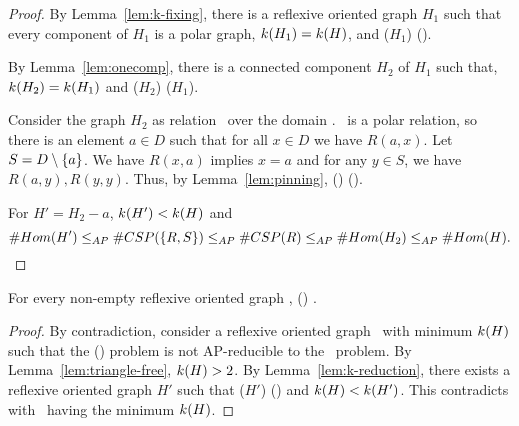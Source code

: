 \begin{proof}
By Lemma~\ref{lem:k-fixing}, there is a reflexive oriented graph \(H_1\) such that
every component of \(H_1\) is a polar graph, \(k(H_1)=k(H)\), and 
\chom(\(H_1\)) \maple \chom(\mH)\@.

By Lemma~\ref{lem:onecomp}, there is a connected component \(H_2\) of \(H_1\) such that,
\(k(H_2)=k(H_1)\) and \chom(\(H_2\)) \maple \chom(\(H_1\))\@.

Consider the graph \(H_2\) as relation \mR\ over the domain \mD\@.
\mR\ is a polar relation, so there is an element \(a \in D\) such that for all \(x \in D\)
we have \(R(a, x)\)\@. Let \(S = D \setminus \{{a}\}\)\@. We have
\(R(x,a)\) implies \(x=a\) and for any \(y \in S\), we have \(R(a, y), R(y, y)\)\@.
Thus, by Lemma~\ref{lem:pinning}, \ccsp() \maple \ccsp(\mR)\@.

For \(H'=H_2 - a\), \(k(H') < k(H)\) and
\[\#Hom(H') \le_{AP} \#CSP(\{{R,S}\}) \le_{AP} \#CSP(R) \le_{AP} \#Hom(H_2) \le_{AP} \#Hom(H).\]
\end{proof}

\begin{theorem}
For every non-empty reflexive oriented graph \mH, \chom(\mH) \mapge \cbis\@.
\end{theorem}


\begin{proof}
By contradiction, consider a reflexive oriented graph \mH\ with minimum \(k(H)\)
such that the \chom(\mH) problem is not AP-reducible to the \cbis\ problem.
By Lemma~\ref{lem:triangle-free}, \(k(H) > 2\)\@. 
By Lemma~\ref{lem:k-reduction}, there exists a reflexive oriented graph \(H'\) such that 
\chom(\(H'\)) \maple \chom(\mH) and \(k(H) < k(H')\)\@.
This contradicts with \mH\ having the minimum \(k(H)\).
\end{proof}
